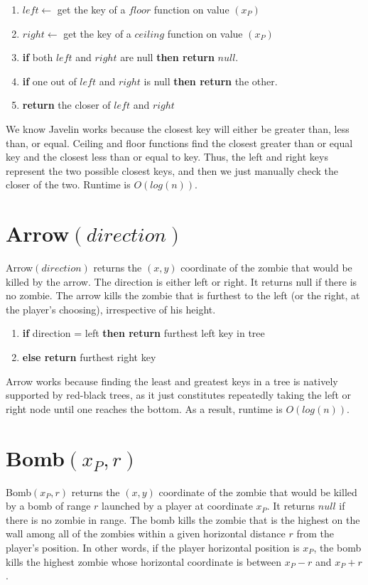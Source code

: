 \documentclass{article}
\begin{document}
\begin{enumerate}
    \item  $left \leftarrow $ get the key of a $floor$ function on value $(x_P)$
    \item  $right \leftarrow $ get the key of a $ceiling$ function on value $(x_P)$
    \item \textbf{if} both  $left$ and $right$ are null \textbf{then return} $null$. 
    \item \textbf{if} one out of $left$ and $right$ is null \textbf{then return} the other. 
    \item \textbf{return} the closer of $left$ and $right$
\end{enumerate}
We know Javelin works because the closest key will either be greater than, less than, or equal. Ceiling and floor functions find the closest greater than or equal key and the closest less than or equal to key. Thus, the left and right keys represent the two possible closest keys, and then we just manually check the closer of the two. Runtime is $O(log(n))$.

\section{Arrow$(direction)$}
Arrow$(direction)$ returns  the  $(x,y)$ coordinate of the zombie that would be killed by the arrow. The direction is either left or right. It returns null if there is no zombie. The arrow  kills  the  zombie  that  is  furthest  to  the  left  (or  the  right, at the player’s choosing), irrespective of his height.

\begin{enumerate}
    \item \textbf{if} direction = left \textbf{then return} furthest left key in tree
    \item \textbf{else return} furthest right key
\end{enumerate}
Arrow works because finding the least and greatest keys in a tree is natively supported by red-black trees, as it just constitutes repeatedly taking the left or right node until one reaches the bottom. As a result, runtime is $O(log(n))$.

\section{Bomb$(x_P,r)$}
Bomb$(x_P, r)$ returns the $(x, y)$ coordinate of the zombie that would be killed by a bomb of range $r$ launched by a player at coordinate $x_P$. It returns $null$ if there is no zombie in range. The bomb  kills the zombie that is the highest on the  wall among all of the zombies within a given horizontal distance $r$ from the player’s position. In other words, if the player horizontal position is $x_P$, the bomb kills the highest zombie whose horizontal coordinate is between $x_P-r$ and $x_P+r$. 
\end{document}
